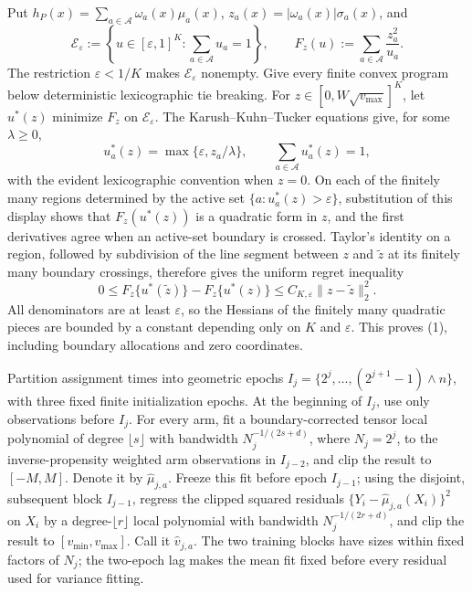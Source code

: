 Put \(h_P(x)=\sum_{a\in\mathcal A}\omega_a(x)\mu_a(x)\), \(z_a(x)=|\omega_a(x)|\sigma_a(x)\), and
\[
\mathcal E_{\varepsilon}:=
\left\{u\in[\varepsilon,1]^K:\sum_{a\in\mathcal A}u_a=1\right\},
\qquad
F_z(u):=\sum_{a\in\mathcal A}\frac{z_a^2}{u_a}.
\]
The restriction \(\varepsilon<1/K\) makes \(\mathcal E_{\varepsilon}\) nonempty.  Give every finite convex program below deterministic lexicographic tie breaking.  For \(z\in[0,W\sqrt{v_{\max}}]^K\), let \(u^*(z)\) minimize \(F_z\) on \(\mathcal E_{\varepsilon}\).  The Karush--Kuhn--Tucker equations give, for some \(\lambda\geq0\),
\[
u_a^*(z)=\max\{\varepsilon,z_a/\lambda\},
\qquad
\sum_{a\in\mathcal A}u_a^*(z)=1,
\]
with the evident lexicographic convention when \(z=0\).  On each of the finitely many regions determined by the active set \(\{a:u_a^*(z)>\varepsilon\}\), substitution of this display shows that \(F_z(u^*(z))\) is a quadratic form in \(z\), and the first derivatives agree when an active-set boundary is crossed.  Taylor's identity on a region, followed by subdivision of the line segment between \(z\) and \(\widetilde z\) at its finitely many boundary crossings, therefore gives the uniform regret inequality
\[
0\leq F_z\{u^*(\widetilde z)\}-F_z\{u^*(z)\}
\leq C_{K,\varepsilon}\|z-\widetilde z\|_2^2.
\tag{1}
\]
All denominators are at least \(\varepsilon\), so the Hessians of the finitely many quadratic pieces are bounded by a constant depending only on \(K\) and \(\varepsilon\).  This proves (1), including boundary allocations and zero coordinates.

Partition assignment times into geometric epochs \(I_j=\{2^j,\ldots,(2^{j+1}-1)\wedge n\}\), with three fixed finite initialization epochs.  At the beginning of \(I_j\), use only observations before \(I_j\).  For every arm, fit a boundary-corrected tensor local polynomial of degree \(\lfloor s\rfloor\) with bandwidth \(N_j^{-1/(2s+d)}\), where \(N_j=2^j\), to the inverse-propensity weighted arm observations in \(I_{j-2}\), and clip the result to \([-M,M]\).  Denote it by \(\widehat\mu_{j,a}\).  Freeze this fit before epoch \(I_{j-1}\); using the disjoint, subsequent block \(I_{j-1}\), regress the clipped squared residuals \(\{Y_i-\widehat\mu_{j,a}(X_i)\}^2\) on \(X_i\) by a degree-\(\lfloor r\rfloor\) local polynomial with bandwidth \(N_j^{-1/(2r+d)}\), and clip the result to \([v_{\min},v_{\max}]\).  Call it \(\widehat v_{j,a}\).  The two training blocks have sizes within fixed factors of \(N_j\); the two-epoch lag makes the mean fit fixed before every residual used for variance fitting.

